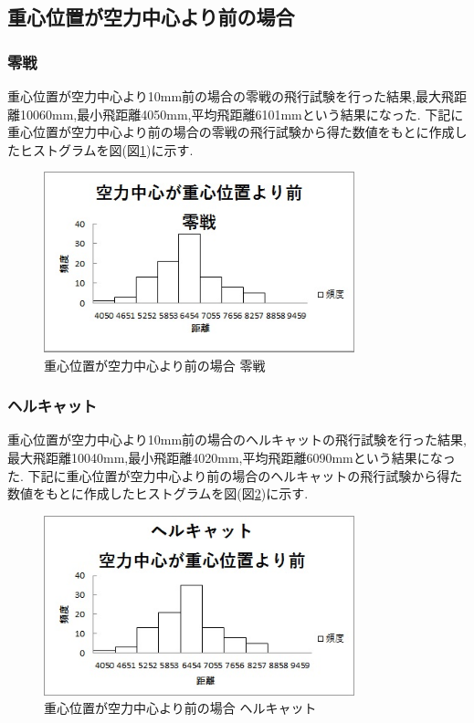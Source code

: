 \subsection{重心位置が空力中心より前の場合}
\subsubsection{零戦}
重心位置が空力中心より10mm前の場合の零戦の飛行試験を行った結果,最大飛距離10060mm,最小飛距離4050mm,平均飛距離6101mmという結果になった.
下記に重心位置が空力中心より前の場合の零戦の飛行試験から得た数値をもとに作成したヒストグラムを図(図\ref{fig:zm})に示す.

\begin{figure}[htbp]
  \begin{center}
    \includegraphics[width=90mm]{zm.JPG}
    \end{center}
  \caption{重心位置が空力中心より前の場合 零戦}
 \label{fig:zm}
\end{figure}

\subsubsection{ヘルキャット}
重心位置が空力中心より10mm前の場合のヘルキャットの飛行試験を行った結果,最大飛距離10040mm,最小飛距離4020mm,平均飛距離6090mmという結果になった.
下記に重心位置が空力中心より前の場合のヘルキャットの飛行試験から得た数値をもとに作成したヒストグラムを図(図\ref{fig:gm})に示す.

\begin{figure}[htbp]
  \begin{center}
    \includegraphics[width=90mm]{gm.JPG}
    \end{center}
  \caption{重心位置が空力中心より前の場合 ヘルキャット}
 \label{fig:gm}
\end{figure}

